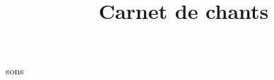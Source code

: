 \documentclass{article}
\title{Carnet de chants}
\begin{document}
\maketitle
{}


\begin{songs}{sons}
\end{songs}
\end{document}
